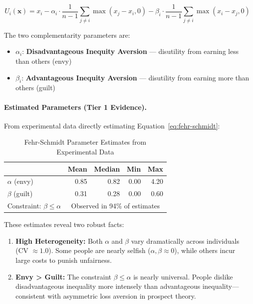 \documentclass[12pt,oneside]{book}
\begin{document}
\begin{equation}
U_i(\mathbf{x}) = x_i - \alpha_i \cdot \frac{1}{n-1} \sum_{j \neq i} \max(x_j - x_i, 0)
                     - \beta_i \cdot \frac{1}{n-1} \sum_{j \neq i} \max(x_i - x_j, 0)
\label{eq:fehr-schmidt}
\end{equation}

The two complementarity parameters are:
\begin{itemize}
  \item $\alpha_i$: \textbf{Disadvantageous Inequity Aversion} — disutility from earning less than others (envy)
  \item $\beta_i$: \textbf{Advantageous Inequity Aversion} — disutility from earning more than others (guilt)
\end{itemize}

\paragraph{Estimated Parameters (Tier 1 Evidence).}

From experimental data directly estimating Equation~\ref{eq:fehr-schmidt}:

\begin{table}[htbp]
\centering
\caption{Fehr-Schmidt Parameter Estimates from Experimental Data}
\label{tab:fehr-schmidt-params}
\begin{tabular}{@{}lrrrr@{}}
\toprule
& \textbf{Mean} & \textbf{Median} & \textbf{Min} & \textbf{Max} \\
\midrule
$\alpha$ (envy)        & 0.85  & 0.82  & 0.00  & 4.20 \\
$\beta$ (guilt)        & 0.31  & 0.28  & 0.00  & 0.60 \\
Constraint: $\beta \leq \alpha$ & \multicolumn{4}{c}{Observed in 94\% of estimates} \\
\midrule
\end{tabular}
\end{table}

These estimates reveal two robust facts:

\begin{enumerate}
  \item \textbf{High Heterogeneity:} Both $\alpha$ and $\beta$ vary dramatically across individuals
        (CV $\approx 1.0$). Some people are nearly selfish ($\alpha, \beta \approx 0$), while others
        incur large costs to punish unfairness.

  \item \textbf{Envy > Guilt:} The constraint $\beta \leq \alpha$ is nearly universal. People dislike
        disadvantageous inequality more intensely than advantageous inequality—consistent with
        asymmetric loss aversion in prospect theory.
\end{enumerate}
\end{document}
